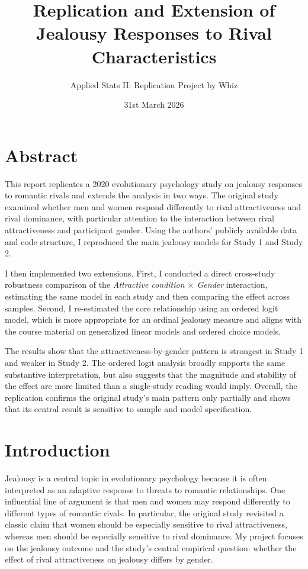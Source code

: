 \documentclass[12pt]{article}
\title{Replication and Extension of Jealousy Responses to Rival Characteristics}
\author{Applied Stats II: Replication Project by Whiz}
\date{31st March 2026}
\begin{document}
	
	\maketitle
	
	\section*{Abstract}
	This report replicates a 2020 evolutionary psychology study on jealousy responses to romantic rivals and extends the analysis in two ways. The original study examined whether men and women respond differently to rival attractiveness and rival dominance, with particular attention to the interaction between rival attractiveness and participant gender. Using the authors’ publicly available data and code structure, I reproduced the main jealousy models for Study 1 and Study 2. 
	
	I then implemented two extensions. First, I conducted a direct cross-study robustness comparison of the \textit{Attractive condition $\times$ Gender} interaction, estimating the same model in each study and then comparing the effect across samples. Second, I re-estimated the core relationship using an ordered logit model, which is more appropriate for an ordinal jealousy measure and aligns with the course material on generalized linear models and ordered choice models. 
	
	The results show that the attractiveness-by-gender pattern is strongest in Study 1 and weaker in Study 2. The ordered logit analysis broadly supports the same substantive interpretation, but also suggests that the magnitude and stability of the effect are more limited than a single-study reading would imply. Overall, the replication confirms the original study’s main pattern only partially and shows that its central result is sensitive to sample and model specification.
	\vspace{3cm}
	\section{Introduction}
	Jealousy is a central topic in evolutionary psychology because it is often interpreted as an adaptive response to threats to romantic relationships. One influential line of argument is that men and women may respond differently to different types of romantic rivals. In particular, the original study revisited a classic claim that women should be especially sensitive to rival attractiveness, whereas men should be especially sensitive to rival dominance. My project focuses on the jealousy outcome and the study’s central empirical question: whether the effect of rival attractiveness on jealousy differs by gender.
	
\end{document}
